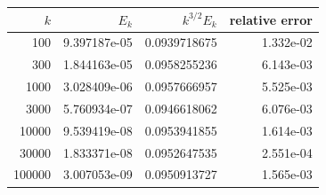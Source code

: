 \begin{tabular}{rrrr}
\toprule
$k$ & $E_k$ & $k^{3/2}E_k$ & relative error\\
\midrule
100 & 9.397187e-05 & 0.0939718675 & 1.332e-02\\
300 & 1.844163e-05 & 0.0958255236 & 6.143e-03\\
1000 & 3.028409e-06 & 0.0957666957 & 5.525e-03\\
3000 & 5.760934e-07 & 0.0946618062 & 6.076e-03\\
10000 & 9.539419e-08 & 0.0953941855 & 1.614e-03\\
30000 & 1.833371e-08 & 0.0952647535 & 2.551e-04\\
100000 & 3.007053e-09 & 0.0950913727 & 1.565e-03\\
\bottomrule
\end{tabular}